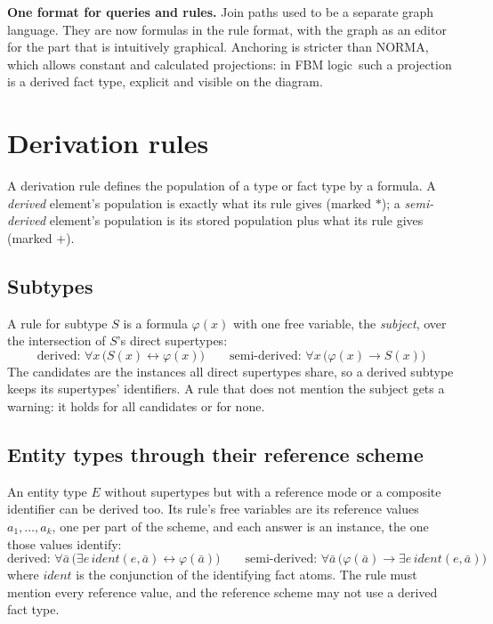 \documentclass[11pt, a4paper]{article}
\newcommand{\FBM}{FBM logic}
\begin{document}
\begin{rationale}
\textbf{One format for queries and rules.} Join paths used to be a separate
graph language. They are now formulas in the rule format, with the graph as
an editor for the part that is intuitively graphical. Anchoring is stricter
than NORMA, which allows constant and calculated projections: in \FBM\ such
a projection is a derived fact type, explicit and visible on the diagram.
\end{rationale}

\section{Derivation rules}
\label{sec:derivation}

A derivation rule defines the population of a type or fact type by a
formula. A \emph{derived} element's population is exactly what its rule
gives (marked $*$); a \emph{semi-derived} element's population is its stored
population plus what its rule gives (marked $+$).

\subsection{Subtypes}

A rule for subtype $S$ is a formula $\varphi(x)$ with one free variable,
the \emph{subject}, over the intersection of $S$'s direct supertypes:
\[
  \text{derived: } \forall x\,\bigl(S(x) \leftrightarrow \varphi(x)\bigr)
  \qquad
  \text{semi-derived: } \forall x\,\bigl(\varphi(x) \to S(x)\bigr)
\]
The candidates are the instances all direct supertypes share, so a derived
subtype keeps its supertypes' identifiers. A rule that does not mention the
subject gets a warning: it holds for all candidates or for none.

\subsection{Entity types through their reference scheme}

An entity type $E$ without supertypes but with a reference mode or a
composite identifier can be derived too. Its rule's free variables are its
reference values $a_1,\dots,a_k$, one per part of the scheme, and each answer
is an instance, the one those values identify:
\[
  \text{derived: } \forall \bar a\,\bigl(\exists e\,\mathit{ident}(e,\bar a) \leftrightarrow \varphi(\bar a)\bigr)
  \qquad
  \text{semi-derived: } \forall \bar a\,\bigl(\varphi(\bar a) \to \exists e\,\mathit{ident}(e,\bar a)\bigr)
\]
where $\mathit{ident}$ is the conjunction of the identifying fact atoms. The
rule must mention every reference value, and the reference scheme may not
use a derived fact type.
\end{document}
